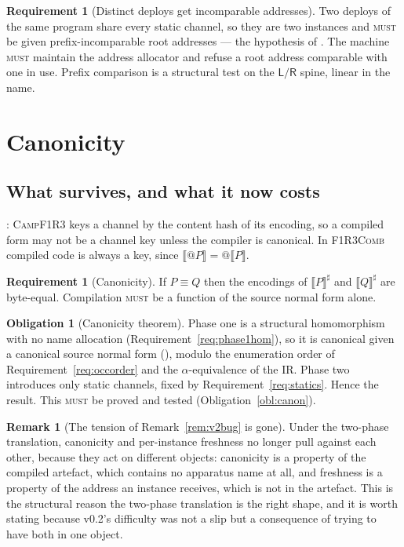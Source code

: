 \documentclass[11pt,a4paper]{article}
\makeatletter
\newcommand{\Comb}{\textsc{F1R3Comb}}
\newcommand{\Camp}{\textsc{CampF1R3}}
\newcommand{\MUST}{\textsc{must}}
\newcommand{\quo}[1]{@#1}
\newcommand{\enc}[1]{\llbracket #1 \rrbracket}
\newcommand{\Lft}{\mathsf{L}}
\newcommand{\Rgt}{\mathsf{R}}
\newcommand{\scong}{\equiv}
\theoremstyle{definition}
\newtheorem{requirement}[definition]{Requirement}
\newtheorem{obligation}[definition]{Obligation}
\newtheorem{remark}[definition]{Remark}
\theoremstyle{plain}
\makeatother
\begin{document}
\begin{requirement}[Distinct deploys get incomparable addresses]\label{req:addrsep}
Two deploys of the same program share every static channel, so they are two
instances and \MUST{} be given prefix-incomparable root addresses ---
the hypothesis of \cite[Lem.~6.11]{draft3}. The machine \MUST{} maintain the
address allocator and refuse a root address comparable with one in use.
Prefix comparison is a structural test on the $\Lft/\Rgt$ spine, linear in the
name.
\end{requirement}

\section{Canonicity}\label{sec:canon}

\subsection{What survives, and what it now costs}

\cite[\S\,identity]{bytecode}: \Camp{} keys a channel by the content hash of
its encoding, so a compiled form may not be a channel key unless the compiler
is canonical. In \Comb{} compiled code is always a key, since
$\enc{\quo{P}} = \quo{\enc{P}}$.

\begin{requirement}[Canonicity]\label{req:canon}
If $P \scong Q$ then the encodings of $\enc{P}^{\sharp}$ and
$\enc{Q}^{\sharp}$ are byte-equal. Compilation \MUST{} be a function of the
source normal form alone.
\end{requirement}

\begin{obligation}[Canonicity theorem]\label{thm:canon}
Phase one is a structural homomorphism with no name allocation
(Requirement~\ref{req:phase1hom}), so it is canonical given a canonical source
normal form (\cite[Prop.~6.9]{k1ndl1ng}), modulo the enumeration order of
Requirement~\ref{req:occorder} and the $\alpha$-equivalence of the IR. Phase
two introduces only static channels, fixed by
Requirement~\ref{req:statics}. Hence the result. This \MUST{} be proved and
tested (Obligation~\ref{obl:canon}).
\end{obligation}

\begin{remark}[The tension of Remark~\ref{rem:v2bug} is gone]
Under the two-phase translation, canonicity and per-instance freshness no
longer pull against each other, because they act on different objects:
canonicity is a property of the compiled artefact, which contains no apparatus
name at all, and freshness is a property of the address an instance receives,
which is not in the artefact. This is the structural reason the two-phase
translation is the right shape, and it is worth stating because v0.2's
difficulty was not a slip but a consequence of trying to have both in one
object.
\end{remark}
\end{document}
